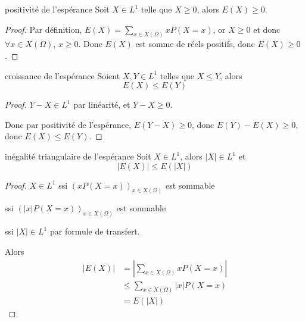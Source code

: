 \begin{proposition}{positivité de l'espérance}{}
    Soit $X \in L^1$ telle que $X \geqslant 0$, alors $E(X) \geqslant 0$.    
\end{proposition}

\begin{proof}
    Par définition, $E(X) = \sum_{x \in X(\Omega)} x P(X = x)$, 
    or $X \geqslant 0$ et donc $\forall x \in X(\Omega), \, x \geqslant 0$.
    Donc $E(X)$ est somme de réels positifs, donc $E(X) \geqslant 0$.
\end{proof}

\begin{proposition}{croissance de l'espérance}{}
    Soient $X, Y \in L^1$ telles que $X \leqslant Y$, alors 
    $$ E(X) \leqslant E(Y) $$
    
\end{proposition}


\begin{proof}
    $Y - X \in L^1$ par linéarité, et $Y - X \geqslant 0$.

    Donc par positivité de l'espérance, $E(Y - X) \geqslant 0$, donc 
    $E(Y) - E(X) \geqslant 0$, donc $E(X) \leqslant E(Y)$.
\end{proof}

\begin{proposition}{inégalité triangulaire de l'espérance}{}
    Soit $X \in L^1$, alors $|X| \in L^1$ et
    $$ |E(X)| \leqslant E(|X|) $$
    
\end{proposition}


\begin{proof}
    $X \in L^1$ ssi $(x P(X = x))_{x \in X(\Omega)}$ est sommable

    ssi $(|x| P(X = x))_{x \in X(\Omega)}$ est sommable

    ssi $|X| \in L^1$ par formule de transfert.

    Alors 
    \begin{align}
        |E(X)| & = \left| \sum_{x \in X(\Omega)} x P(X = x) \right| \\
        & \leqslant \sum_{x \in X(\Omega)} |x| P(X = x) \\
        & = E(|X|)
    \end{align} 
\end{proof}

